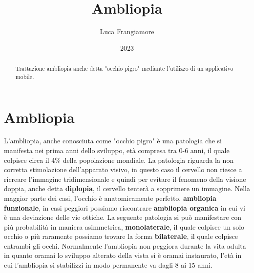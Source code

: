 \documentclass[10pt,a4paper]{article}
\title{Ambliopia}
\author{Luca Frangiamore}
\date{2023}
\begin{document}
	
	\maketitle
	\tableofcontents{\tiny }
	
	
	\begin{abstract}
		Trattazione ambliopia anche detta "occhio pigro" mediante l'utilizzo di un applicativo mobile.
	\end{abstract} 
    \newpage
    \null
    \newpage
    
	 
	\section {Ambliopia}
	L'ambliopia, anche conosciuta come "occhio pigro" è una patologia che si manifesta nei prima anni dello sviluppo, età compresa tra 0-6 anni, il quale colpisce circa il 4\% della popolazione mondiale.
	La patologia riguarda la non corretta stimolazione dell'apparato visivo, in questo caso il cervello non riesce a ricreare l'immagine tridimensionale e quindi per evitare il fenomeno della visione doppia, anche detta \textbf{diplopia}, il cervello tenterà a sopprimere un immagine.
	Nella maggior parte dei casi, l'occhio è anatomicamente perfetto, \textbf{ambliopia funzionale}, in casi peggiori possiamo riscontrare \textbf{ambliopia organica} in cui vi è una deviazione delle vie ottiche.
	La seguente patologia si può manifestare con più probabilità in maniera asimmetrica, \textbf{monolaterale}, il quale colpisce un solo occhio o più raramente possiamo trovare la forma \textbf{bilaterale}, il quale colpisce entrambi gli occhi.
	Normalmente l'ambliopia non peggiora durante la vita adulta in quanto oramai lo sviluppo alterato della vista si è oramai instaurato, l'età in cui l'ambliopia si stabilizzi in modo permanente va dagli 8 ai 15 anni.
\end{document}
